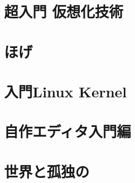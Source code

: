 \documentclass[autodetect-engine,dvipdfmx-if-dvi,ja=standard,a5paper,12pt,twoside,openany,layout=v2,tombow]{bxjsbook}
\newcommand{\articlepath}{./articles}
\begin{document}
\chapter{超入門 仮想化技術}


\chapter{ほげ}


\chapter{入門Linux Kernel}


\chapter{自作エディタ入門編}


\chapter{世界と孤独の}


\newpage
\myimpression
\end{document}

